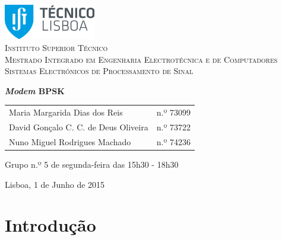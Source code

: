 \documentclass[11pt]{article}
\numberwithin{equation}{section}
\begin{document}
\begin{titlepage}
\begin{center}

\hfill \break
\hfill \break

\includegraphics[width=0.3\textwidth]{./logo}~\\[1cm] 

\textsc{\LARGE Instituto Superior Técnico}\\[0.25cm]
\textsc{\Large Mestrado Integrado em Engenharia Electrotécnica e de Computadores}\\[1.8cm]
\textsc{\huge Sistemas Electrónicos de Processamento de Sinal}\\[0.25cm]

\vspace{6mm}

{\huge \bfseries \textit{Modem} BPSK \\[1cm]}

\begin{tabular}{ l l }
Maria Margarida Dias dos Reis & \hspace{2mm} n.º 73099 \\
David Gonçalo C. C. de Deus Oliveira & \hspace{2mm} n.º 73722 \\
Nuno Miguel Rodrigues Machado & \hspace{2mm} n.º 74236
\end{tabular}

\vspace{7mm}

Grupo n.º 5 de segunda-feira das 15h30 - 18h30

\vfill

{\large Lisboa, 1 de Junho de 2015} 

\end{center}
\end{titlepage}

\clearpage

\tableofcontents
\pagebreak

\clearpage
{}

\section{Introdução}
\end{document}
